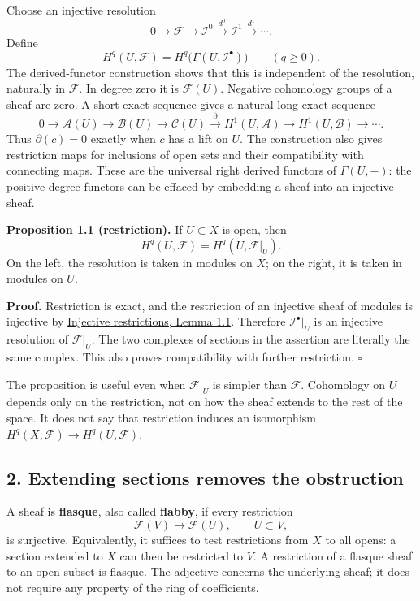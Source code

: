 \documentclass[11pt]{article}
\begin{document}
Choose an injective resolution \[
0\longrightarrow\mathcal F\longrightarrow\mathcal I^0
\xrightarrow{d^0}\mathcal I^1\xrightarrow{d^1}\cdots.
\] Define \[
H^q(U,\mathcal F)
=H^q\bigl(\Gamma(U,\mathcal I^\bullet)\bigr)
\qquad(q\geq0).
\] The derived-functor construction shows that this is independent of
the resolution, naturally in \(\mathcal F\). In degree zero it is
\(\mathcal F(U)\). Negative cohomology groups of a sheaf are zero. A
short exact sequence gives a natural long exact sequence \[
0\to\mathcal A(U)\to\mathcal B(U)\to\mathcal C(U)
\xrightarrow{\partial}H^1(U,\mathcal A)
\to H^1(U,\mathcal B)\to\cdots.
\] Thus \(\partial(c)=0\) exactly when \(c\) has a lift on \(U\). The
construction also gives restriction maps for inclusions of open sets and
their compatibility with connecting maps. These are the universal right
derived functors of \(\Gamma(U,-)\): the positive-degree functors can be
effaced by embedding a sheaf into an injective sheaf.

\textbf{Proposition 1.1 (restriction).} If \(U\subset X\) is open, then
\[
H^q(U,\mathcal F)=H^q(U,\mathcal F|_U).
\] On the left, the resolution is taken in modules on \(X\); on the
right, it is taken in modules on \(U\).

\textbf{Proof.} Restriction is exact, and the restriction of an
injective sheaf of modules is injective by
\href{../derived-categories-and-sheaf-operations/injective-modules-and-bounded-below-derived-functors.html\#1-extending-maps-and-extending-sections}{Injective
restrictions, Lemma 1.1}. Therefore \(\mathcal I^\bullet|_U\) is an
injective resolution of \(\mathcal F|_U\). The two complexes of sections
in the assertion are literally the same complex. This also proves
compatibility with further restriction. \(\square\)

The proposition is useful even when \(\mathcal F|_U\) is simpler than
\(\mathcal F\). Cohomology on \(U\) depends only on the restriction, not
on how the sheaf extends to the rest of the space. It does not say that
restriction induces an isomorphism
\(H^q(X,\mathcal F)\to H^q(U,\mathcal F)\).

\subsection{2. Extending sections removes the
obstruction}\label{extending-sections-removes-the-obstruction}

A sheaf is \textbf{flasque}, also called \textbf{flabby}, if every
restriction \[
\mathcal F(V)\longrightarrow\mathcal F(U),\qquad U\subset V,
\] is surjective. Equivalently, it suffices to test restrictions from
\(X\) to all opens: a section extended to \(X\) can then be restricted
to \(V\). A restriction of a flasque sheaf to an open subset is flasque.
The adjective concerns the underlying sheaf; it does not require any
property of the ring of coefficients.
\end{document}

